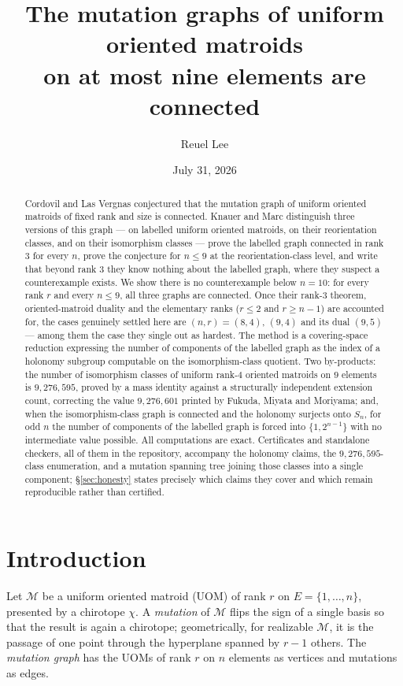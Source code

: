 \documentclass[11pt]{amsart}
\title[Mutation graphs of uniform oriented matroids on $\le 9$ elements]{The mutation graphs of uniform oriented matroids\\ on at most nine elements are connected}
\author{Reuel Lee}
\date{July 31, 2026}
\theoremstyle{remark}
\begin{document}
\begin{abstract}
Cordovil and Las Vergnas conjectured that the mutation graph of uniform
oriented matroids of fixed rank and size is connected. Knauer and Marc
distinguish three versions of this graph --- on labelled uniform oriented
matroids, on their reorientation classes, and on their isomorphism
classes --- prove the labelled graph connected in rank $3$ for every $n$,
prove the conjecture for $n\le 9$ at the reorientation-class level, and
write that beyond rank $3$ they know nothing about the labelled graph,
where they suspect a counterexample exists. We show there is no
counterexample below $n=10$: for every rank $r$ and every $n\le 9$, all
three graphs are connected. Once their rank-$3$ theorem, oriented-matroid
duality and the elementary ranks ($r\le2$ and $r\ge n-1$) are accounted
for, the cases genuinely settled here are $(n,r)=(8,4)$, $(9,4)$ and its
dual $(9,5)$ --- among them the case they single out as hardest. The
method is a covering-space reduction expressing the number of components
of the labelled graph as the index of a holonomy subgroup computable on
the isomorphism-class quotient. Two by-products: the number of
isomorphism classes of uniform rank-$4$ oriented matroids on $9$ elements
is $9{,}276{,}595$, proved by a mass identity against a structurally
independent extension count, correcting the value $9{,}276{,}601$ printed
by Fukuda, Miyata and Moriyama; and, when the isomorphism-class graph is
connected and the holonomy surjects onto $S_n$, for odd $n$ the number of
components of the labelled graph is forced into $\{1,2^{n-1}\}$ with no
intermediate value possible. All computations are exact. Certificates and
standalone checkers, all of them in the repository, accompany the holonomy
claims, the $9{,}276{,}595$-class enumeration, and a mutation spanning tree
joining those classes into a single component; \S\ref{sec:honesty} states
precisely which claims they cover and which remain reproducible rather
than certified.
\end{abstract}

\maketitle

\section{Introduction}

Let $\mathcal{M}$ be a uniform oriented matroid (UOM) of rank $r$ on
$E=\{1,\dots,n\}$, presented by a chirotope $\chi$. A \emph{mutation} of
$\mathcal{M}$ flips the sign of a single basis so that the result is
again a chirotope; geometrically, for realizable $\mathcal{M}$, it is the
passage of one point through the hyperplane spanned by $r-1$ others. The
\emph{mutation graph} has the UOMs of rank $r$ on $n$ elements as
vertices and mutations as edges.
\end{document}
